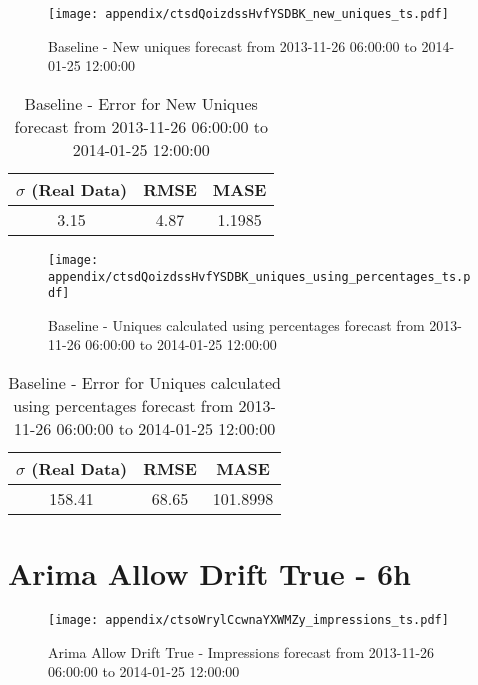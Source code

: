 \begin{figure}[H] \begin{center} \leavevmode
\texttt{[image: appendix/ctsdQoizdssHvfYSDBK\_new\_uniques\_ts.pdf]} \caption{
Baseline - New uniques forecast from 2013-11-26 06:00:00 to 2014-01-25 12:00:00} \label{fig:appendix/ctsdQoizdssHvfYSDBK_new_uniques_ts.pdf} \end{center}
\end{figure}

\begin{table}[H]
\centering
\footnotesize
\begin{tabular}{ccc}
$\sigma$ (Real Data) & RMSE & MASE   \\ \hline
3.15 & 4.87 & 1.1985 \\
\end{tabular}

\vspace{0.5cm}

\caption{
Baseline - Error for New Uniques forecast from 2013-11-26 06:00:00 to 2014-01-25 12:00:00}
\end{table}

\begin{figure}[H] \begin{center} \leavevmode
\texttt{[image: appendix/ctsdQoizdssHvfYSDBK\_uniques\_using\_percentages\_ts.pdf]} \caption{
Baseline - Uniques calculated using percentages forecast from 2013-11-26 06:00:00 to 2014-01-25 12:00:00} \label{fig:appendix/ctsdQoizdssHvfYSDBK_uniques_using_percentages_ts.pdf} \end{center}
\end{figure}

\begin{table}[H]
\centering
\footnotesize
\begin{tabular}{ccc}
$\sigma$ (Real Data) & RMSE & MASE   \\ \hline
158.41 & 68.65 & 101.8998 \\
\end{tabular}

\vspace{0.5cm}

\caption{
Baseline - Error for Uniques calculated using percentages forecast from 2013-11-26 06:00:00 to 2014-01-25 12:00:00}
\end{table}

\section{Arima Allow Drift True - 6h}
\begin{figure}[H] \begin{center} \leavevmode
\texttt{[image: appendix/ctsoWrylCcwnaYXWMZy\_impressions\_ts.pdf]} \caption{
Arima Allow Drift True - Impressions forecast from 2013-11-26 06:00:00 to 2014-01-25 12:00:00} \label{fig:appendix/ctsoWrylCcwnaYXWMZy_impressions_ts.pdf} \end{center}
\end{figure}

